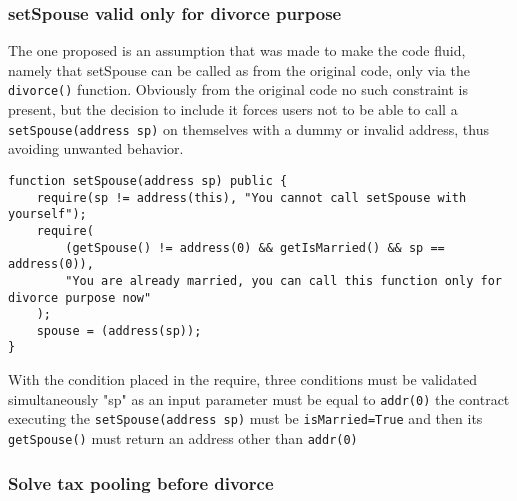 \documentclass{article}
\begin{document}
\subsubsection{setSpouse valid only for divorce purpose}
The one proposed is an assumption that was made to make the code fluid, namely that setSpouse can be called as from the original code, only via the \texttt{divorce()} function. Obviously from the original code no such constraint is present, but the decision to include it forces users not to be able to call a \texttt{setSpouse(address sp)} on themselves with a dummy or invalid address, thus avoiding unwanted behavior.
\begin{verbatim}
function setSpouse(address sp) public {
    require(sp != address(this), "You cannot call setSpouse with yourself");
    require(
        (getSpouse() != address(0) && getIsMarried() && sp == address(0)),
        "You are already married, you can call this function only for divorce purpose now"
    );
    spouse = (address(sp));
}
\end{verbatim}
With the condition placed in the require, three conditions must be validated simultaneously "sp" as an input parameter must be equal to \texttt{addr(0)} the contract executing the \texttt{setSpouse(address sp)}  must be \texttt{isMarried=True} and then its \texttt{getSpouse()} must return an address other than \texttt{addr(0)}
\subsubsection{Solve tax pooling before divorce}
\end{document}
